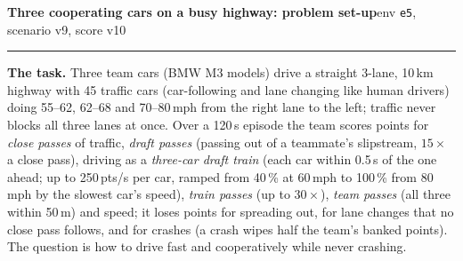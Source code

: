 \documentclass[10pt]{article}
\begin{document}
{\Large\bfseries Three cooperating cars on a busy highway: problem set-up}\hfill{\small env \texttt{e5}, scenario v9, score v10}\\[-2pt]
\rule{\linewidth}{0.6pt}

\small
\textbf{The task.} Three team cars (BMW M3 models) drive a straight 3-lane, 10\,km highway with 45 traffic cars
(car-following and lane changing like human drivers) doing 55--62, 62--68 and 70--80\,mph from the right lane to
the left; traffic never blocks all three lanes at once. Over a 120\,s episode the team scores points for
\emph{close passes} of traffic, \emph{draft passes} (passing out of a teammate's slipstream, $15\times$ a close pass),
driving as a \emph{three-car draft train} (each car within 0.5\,s of the one ahead; up to 250\,pts/s per car, ramped
from 40\,\% at 60\,mph to 100\,\% from 80\,mph by the slowest car's speed), \emph{train passes} (up to $30\times$),
\emph{team passes} (all three within 50\,m) and speed; it loses points for spreading out, for lane changes that no
close pass follows, and for crashes (a crash wipes half the team's banked points). The question is how to drive fast
and cooperatively while never crashing.
\end{document}
